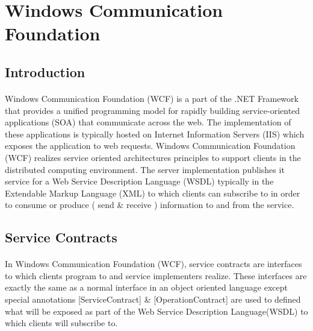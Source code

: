	\section{Windows Communication Foundation}
		\subsection{Introduction}
		\vspace{5mm}
		\begin{multicols}{2}
		\paragraph{}
		
		Windows Communication Foundation (WCF) is a part of the .NET Framework that provides a unified programming model for 
		rapidly building service-oriented applications (SOA) that communicate across the web.  The implementation of these applications is typically 
		hosted on Internet Information Servers (IIS) which exposes the application to web requests.  Windows Communication Foundation (WCF) 
		realizes service oriented architectures principles to support clients in the distributed computing environment.  The server 
		implementation publishes it service for a Web Service Description Language (WSDL) typically in the Extendable Markup Language (XML) 
		to which clients can subscribe to in order to consume or produce ( send \& receive ) information to and from the service.

		\end{multicols}
		
		\subsection{Service Contracts}
		\vspace{5mm}
		\begin{multicols}{2}
		\paragraph{}
		
		In Windows Communication Foundation (WCF), service contracts are interfaces to which clients program to and service implementers realize.
		These interfaces are exactly the same as a normal interface in an object oriented language except special annotations [ServiceContract] \&
		[OperationContract] are used to defined what will be exposed as part of the Web Service Description Language(WSDL) to which clients will
		subscribe to.
		
		\end{multicols}
		

